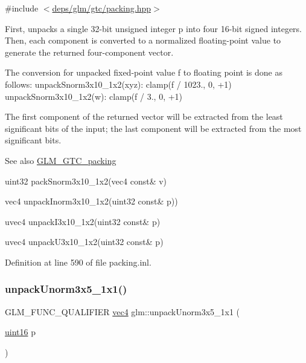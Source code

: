{\ttfamily \#include $<$\hyperlink{gtc_2packing_8hpp}{deps/glm/gtc/packing.\+hpp}$>$}

First, unpacks a single 32-\/bit unsigned integer p into four 16-\/bit signed integers. Then, each component is converted to a normalized floating-\/point value to generate the returned four-\/component vector.

The conversion for unpacked fixed-\/point value f to floating point is done as follows\+: unpack\+Snorm3x10\+\_\+1x2(xyz)\+: clamp(f / 1023., 0, +1) unpack\+Snorm3x10\+\_\+1x2(w)\+: clamp(f / 3., 0, +1)

The first component of the returned vector will be extracted from the least significant bits of the input; the last component will be extracted from the most significant bits.

\begin{DoxySeeAlso}{See also}
\hyperlink{group__gtc__packing}{G\+L\+M\+\_\+\+G\+T\+C\+\_\+packing} 

uint32 pack\+Snorm3x10\+\_\+1x2(vec4 const\& v) 

vec4 unpack\+Inorm3x10\+\_\+1x2(uint32 const\& p)) 

uvec4 unpack\+I3x10\+\_\+1x2(uint32 const\& p) 

uvec4 unpack\+U3x10\+\_\+1x2(uint32 const\& p) 
\end{DoxySeeAlso}


Definition at line 590 of file packing.\+inl.

\mbox{\label{group__gtc__packing_gaab3b476e8f320670717fd518f350ce28}} 
\subsubsection{\texorpdfstring{unpack\+Unorm3x5\+\_\+1x1()}{unpackUnorm3x5\_1x1()}}
{\footnotesize\ttfamily G\+L\+M\+\_\+\+F\+U\+N\+C\+\_\+\+Q\+U\+A\+L\+I\+F\+I\+ER \hyperlink{group__core__types_ga5881b1b022d7fd1b7218f5916532dd02}{vec4} glm\+::unpack\+Unorm3x5\+\_\+1x1 (\begin{DoxyParamCaption}\item[{\hyperlink{group__gtc__type__precision_gad8c2939e1fdd8e5828b31d95c52255d5}{uint16}}]{p }\end{DoxyParamCaption})}



